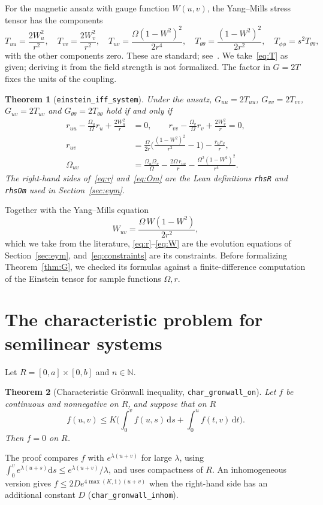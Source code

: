 \documentclass[11pt]{amsart}
\newtheorem{theorem}{Theorem}[section]
\theoremstyle{definition}
\theoremstyle{remark}
\newcommand{\lean}[1]{\texttt{#1}}
\newcommand{\dd}{\mathrm{d}}
\begin{document}
For the magnetic ansatz with gauge function $W(u,v)$, the Yang--Mills stress tensor has the components
\begin{equation}\label{eq:T}
T_{uu}=\frac{2W_u^2}{r^2},\quad T_{vv}=\frac{2W_v^2}{r^2},\quad T_{uv}=\frac{\Omega(1-W^2)^2}{2r^4},\quad T_{\theta\theta}=\frac{(1-W^2)^2}{2r^2},\quad T_{\phi\phi}=s^2T_{\theta\theta},
\end{equation}
with the other components zero. These are standard; see~\cite{VolkovGaltsov1999}. We take~\eqref{eq:T} as given; deriving it from the field strength is not formalized. The factor in $G=2T$ fixes the units of the coupling.

\begin{theorem}[\lean{einstein\_iff\_system}]\label{thm:reduction}
Under the ansatz, $G_{uu}=2T_{uu}$, $G_{vv}=2T_{vv}$, $G_{uv}=2T_{uv}$ and $G_{\theta\theta}=2T_{\theta\theta}$ hold if and only if
\begin{align}
r_{uu}-\frac{\Omega_u}{\Omega}r_u+\frac{2W_u^2}{r}&=0,\qquad r_{vv}-\frac{\Omega_v}{\Omega}r_v+\frac{2W_v^2}{r}=0,\label{eq:constraints}\\
r_{uv}&=\frac{\Omega}{2r}\Big(\frac{(1-W^2)^2}{r^2}-1\Big)-\frac{r_ur_v}{r},\label{eq:r}\\
\Omega_{uv}&=\frac{\Omega_u\Omega_v}{\Omega}-\frac{2\Omega\,r_{uv}}{r}-\frac{\Omega^2(1-W^2)^2}{r^4}.\label{eq:Om}
\end{align}
The right-hand sides of~\eqref{eq:r} and~\eqref{eq:Om} are the Lean definitions \lean{rhsR} and \lean{rhsOm} used in Section~\ref{sec:eym}.
\end{theorem}
Together with the Yang--Mills equation
\begin{equation}\label{eq:W}
W_{uv}=\frac{\Omega\,W(1-W^2)}{2r^2},
\end{equation}
which we take from the literature, \eqref{eq:r}--\eqref{eq:W} are the evolution equations of Section~\ref{sec:eym}, and~\eqref{eq:constraints} are its constraints. Before formalizing Theorem~\ref{thm:G}, we checked its formulas against a finite-difference computation of the Einstein tensor for sample functions $\Omega,r$.

\section{The characteristic problem for semilinear systems}\label{sec:goursat}

Let $R=[0,a]\times[0,b]$ and $n\in\mathbb N$.

\begin{theorem}[Characteristic Gr\"onwall inequality, \lean{char\_gronwall\_on}]
Let $f$ be continuous and nonnegative on $R$, and suppose that on $R$
\[
f(u,v)\le K\Big(\int_0^vf(u,s)\,\dd s+\int_0^uf(t,v)\,\dd t\Big).
\]
Then $f=0$ on $R$.
\end{theorem}
The proof compares $f$ with $e^{\lambda(u+v)}$ for large $\lambda$, using $\int_0^ve^{\lambda(u+s)}\dd s\le e^{\lambda(u+v)}/\lambda$, and uses compactness of $R$. An inhomogeneous version gives $f\le2De^{4\max(K,1)(u+v)}$ when the right-hand side has an additional constant $D$ (\lean{char\_gronwall\_inhom}).
\end{document}
